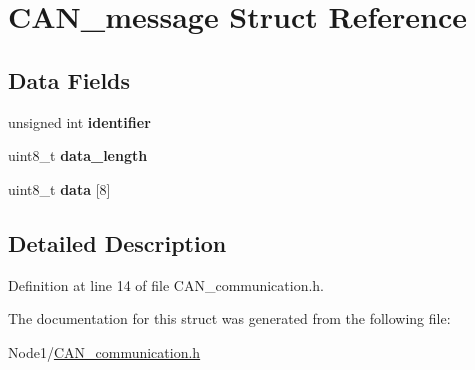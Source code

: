 \hypertarget{structCAN__message}{}\section{C\+A\+N\+\_\+message Struct Reference}
\label{structCAN__message}
\subsection*{Data Fields}
\begin{DoxyCompactItemize}
\item 
\mbox{\label{structCAN__message_a2ad635982c49f59fa4e4e1176776dbb9}} 
unsigned int {\bfseries identifier}
\item 
\mbox{\label{structCAN__message_ae134a25cd0a54c906bee7aa559967193}} 
uint8\+\_\+t {\bfseries data\+\_\+length}
\item 
\mbox{\label{structCAN__message_adc9099f5d7ed451a150dc5f277c6579d}} 
uint8\+\_\+t {\bfseries data} \mbox{[}8\mbox{]}
\end{DoxyCompactItemize}


\subsection{Detailed Description}


Definition at line 14 of file C\+A\+N\+\_\+communication.\+h.



The documentation for this struct was generated from the following file\+:\begin{DoxyCompactItemize}
\item 
Node1/\hyperlink{CAN__communication_8h}{C\+A\+N\+\_\+communication.\+h}\end{DoxyCompactItemize}
